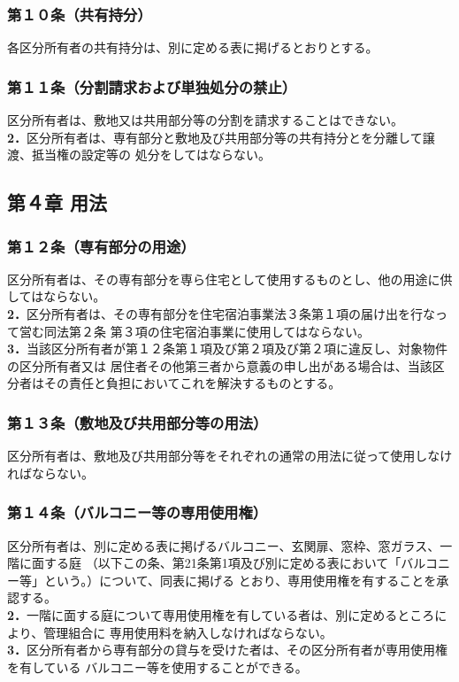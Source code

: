 \documentclass[
  luatex,
  paper=a4paper,
  fontsize=11pt,
  jafontsize=10pt,
  jlreq_notes,
]{jlreq}
\begin{document}
  \subsubsection*{第１０条（共有持分）}
  各区分所有者の共有持分は、別に定める表に掲げるとおりとする。
  \subsubsection*{第１１条（分割請求および単独処分の禁止）}
  区分所有者は、敷地又は共用部分等の分割を請求することはできない。\\
  \textbf{2．}区分所有者は、専有部分と敷地及び共用部分等の共有持分とを分離して譲渡、抵当権の設定等の
  処分をしてはならない。
  
  \begin{center}
  \subsection*{第４章 用法}
  \end{center}
  \subsubsection*{第１２条（専有部分の用途）}
  区分所有者は、その専有部分を専ら住宅として使用するものとし、他の用途に供してはならない。\\
  \textbf{2．}区分所有者は、その専有部分を住宅宿泊事業法３条第１項の届け出を行なって営む同法第２条
  第３項の住宅宿泊事業に使用してはならない。\\
  \textbf{3．}当該区分所有者が第１２条第１項及び第２項及び第２項に違反し、対象物件の区分所有者又は
  居住者その他第三者から意義の申し出がある場合は、当該区分者はその責任と負担においてこれを解決するものとする。
  \subsubsection*{第１３条（敷地及び共用部分等の用法）}
  区分所有者は、敷地及び共用部分等をそれぞれの通常の用法に従って使用しなければならない。
  \subsubsection*{第１４条（バルコニー等の専用使用権）}
  区分所有者は、別に定める表に掲げるバルコニー、玄関扉、窓枠、窓ガラス、一階に面する庭
  （以下この条、第21条第1項及び別に定める表において「バルコニー等」という。）について、同表に掲げる
  とおり、専用使用権を有することを承認する。\\
  \textbf{2．}一階に面する庭について専用使用権を有している者は、別に定めるところにより、管理組合に
  専用使用料を納入しなければならない。\\
  \textbf{3．}区分所有者から専有部分の貸与を受けた者は、その区分所有者が専用使用権を有している
  バルコニー等を使用することができる。
\end{document}
